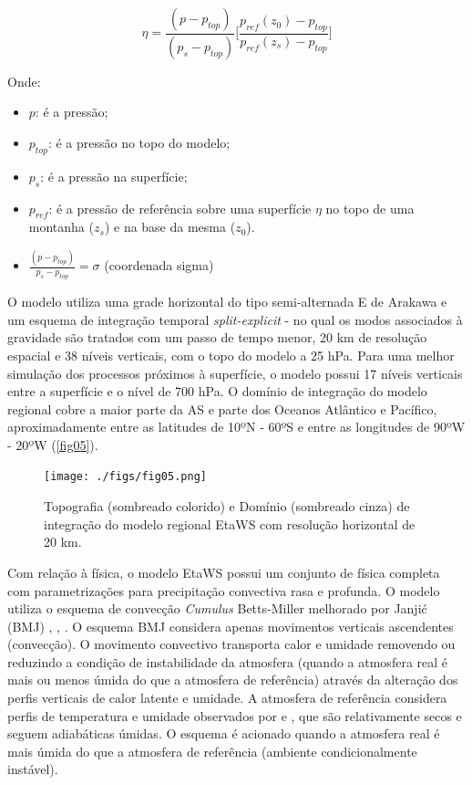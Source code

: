 \begin{equation}
\eta=\frac{(p-p_{top})}{(p_{s}-p_{top})}\bigg[\frac{p_{ref}(z_{0})-p_{top}}{p_{ref}(z_{s})-p_{top}}\bigg]
\label{form09}
\end{equation}

Onde:

\begin{itemize}
\item $p$: é a pressão;
\item $p_{top}$: é a pressão no topo do modelo;
\item $p_{s}$: é a pressão na superfície;
\item $p_{ref}$: é a pressão de referência sobre uma superfície $\eta$ no topo de uma montanha ($z_{s}$) e na base da mesma ($z_{0}$).
\item $\frac{(p-p_{top})}{p_{s}-p_{top}}=\sigma$ (coordenada sigma)
\end{itemize}

O modelo utiliza uma grade horizontal do tipo semi-alternada E de Arakawa \cite{arakawalamb77} e um esquema de integração temporal \textit{split-explicit} - no qual os modos associados à gravidade são tratados com um passo de tempo menor, 20 km de resolução espacial e 38 níveis verticais, com o topo do modelo a 25 hPa. Para uma melhor simulação dos processos próximos à superfície, o modelo possui 17 níveis verticais entre a superfície e o nível de 700 hPa. O domínio de integração do modelo regional cobre a maior parte da AS e parte dos Oceanos Atlântico e Pacífico, aproximadamente entre as latitudes de 10ºN - 60ºS e entre as longitudes de 90ºW - 20ºW (\autoref{fig05}). 

\begin{figure}
\centering
\texttt{[image: ./figs/fig05.png]}
\caption{Topografia (sombreado colorido) e Domínio (sombreado cinza) de integração do modelo regional EtaWS com resolução horizontal de 20 km.}
\label{fig05}
\end{figure}

Com relação à física, o modelo EtaWS possui um conjunto de física completa com parametrizações para precipitação convectiva rasa e profunda. O modelo utiliza o esquema de convecção \textit{Cumulus} Betts-Miller melhorado por Janjić (BMJ) \cite{betts86}, \cite{bettsmiller86}, \cite{janjic94}. O esquema BMJ considera apenas movimentos verticais ascendentes (convecção). O movimento convectivo transporta calor e umidade removendo ou reduzindo a condição de instabilidade da atmosfera (quando a atmosfera real é mais ou menos úmida do que a atmosfera de referência) através da alteração dos perfis verticais de calor latente e umidade. A atmosfera de referência considera perfis de temperatura e umidade observados por \cite{betts86} e \cite{bettsmiller86}, que são relativamente secos e seguem adiabáticas úmidas. O esquema é acionado quando a atmosfera real é mais úmida do que a atmosfera de referência (ambiente condicionalmente instável).

